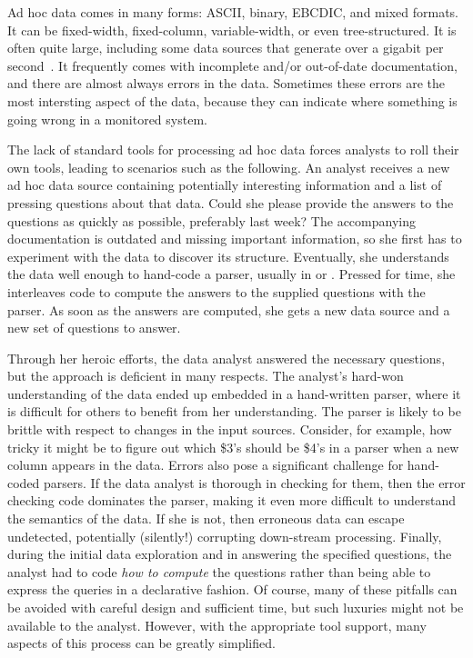 Ad hoc data comes in many forms: ASCII, binary, EBCDIC, and mixed
formats.  It can be fixed-width, fixed-column, variable-width, or even
tree-structured. It is often quite large, including some data sources
that generate over a gigabit per second~\cite{gigascope}. It frequently
comes with incomplete and/or out-of-date documentation, and there are
almost always errors in the data.  Sometimes these errors are the most
intersting aspect of the data, because they can indicate where
something is going wrong in a monitored system.

The lack of standard tools for processing ad hoc data forces
analysts to roll their own tools, leading to scenarios such as the
following.  An analyst receives a new ad hoc data source containing
potentially interesting information and a list of pressing questions
about that data.  Could she please provide the answers to the
questions as quickly as possible, preferably last week?  The
accompanying documentation is outdated and missing important
information, so she first has to experiment with the data to discover
its structure.   Eventually, she understands the data well enough to hand-code a
parser, usually in \C{} or \perl{}.  Pressed for time, she interleaves
code to compute the answers to the supplied questions with the parser.
As soon as the answers are computed, she gets a new data source and a
new set of questions to answer.

Through her heroic efforts, the data analyst answered
the necessary questions, but the approach is deficient in many
respects.  
The analyst's hard-won understanding of the data ended up embedded in
a hand-written parser, where it is difficult for others to benefit
from her understanding.
The parser is likely to be brittle with respect to changes in the
input sources.  Consider, for example, how tricky it might be to
figure out which \$3's should be \$4's in a \perl{} parser when a new
column appears in the data.
Errors also pose a significant challenge for hand-coded
parsers.  If the data analyst is thorough in checking for them, then
the error checking code dominates the parser, making it even more
difficult to understand the semantics of the data.  If she is not,
then erroneous data can escape undetected, potentially (silently!)
corrupting down-stream processing.
Finally, during the initial data exploration and in answering the
specified questions, the analyst had to code \textit{how to compute}
the questions rather than being able to express the queries in a
declarative fashion. 
Of course, many of these pitfalls can be avoided with careful design
and sufficient time, but such luxuries might not be available to the analyst.
However, with the appropriate tool support, many aspects of this
process can be greatly simplified.


